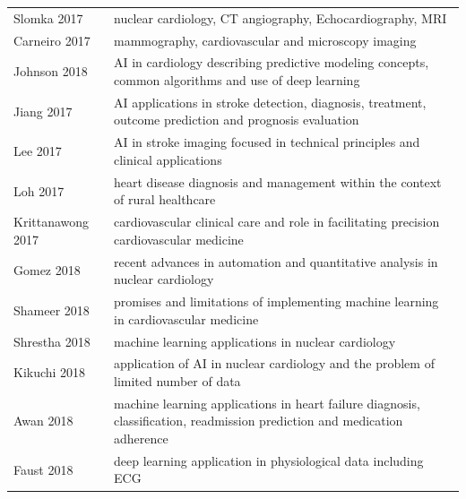 \documentclass[journal]{IEEEtran}
\begin{document}
\begin{table}[!t]
\begin{tabularx}{\textwidth}{l l}
		Slomka 2017\cite{slomka2017cardiac}                & nuclear cardiology, CT angiography, Echocardiography, MRI                                                                 \\
		Carneiro 2017\cite{carneiro2017review}             & mammography, cardiovascular and microscopy imaging                                                                        \\
		Johnson 2018\cite{johnson2018artificial}           & AI in cardiology describing predictive modeling concepts, common algorithms and use of deep learning                      \\
		Jiang 2017\cite{jiang2017artificial}               & AI applications in stroke detection, diagnosis, treatment, outcome prediction and prognosis evaluation                    \\
		Lee 2017\cite{lee2017deepb}                        & AI in stroke imaging focused in technical principles and clinical applications                                            \\
		Loh 2017\cite{loh2017deep}                         & heart disease diagnosis and management within the context of rural healthcare                                             \\
		Krittanawong 2017\cite{krittanawong2017artificial} & cardiovascular clinical care and role in facilitating precision cardiovascular medicine                                   \\
		Gomez 2018\cite{gomez2018new}                      & recent advances in automation and quantitative analysis in nuclear cardiology                                             \\
		Shameer 2018\cite{shameer2018machine}              & promises and limitations of implementing machine learning in cardiovascular medicine                                      \\
		Shrestha 2018\cite{shrestha2018machine}            & machine learning applications in nuclear cardiology                                                                       \\
		Kikuchi 2018\cite{kikuchi2018future}               & application of AI in nuclear cardiology and the problem of limited number of data                                         \\
		Awan 2018\cite{awan2018machine}                    & machine learning applications in heart failure diagnosis, classification, readmission prediction and medication adherence \\
		Faust 2018\cite{faust2018deep}                     & deep learning application in physiological data including ECG                                                             \\
		\bottomrule
	\end{tabularx}
\end{table}
\end{document}
